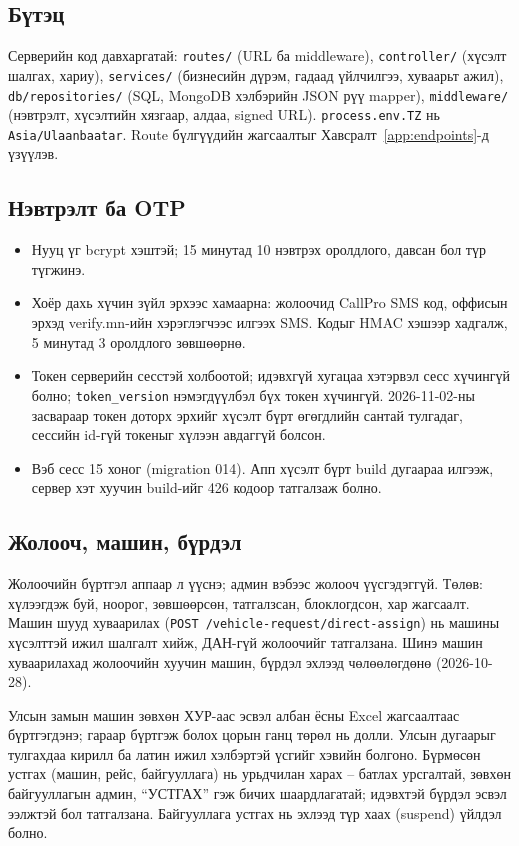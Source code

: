 \documentclass[
12pt,
oneside,
english,
onehalfspacing,
nolistspacing,
headsepline,
]{MUST-Thesis}
\begin{document}
\subsection{Бүтэц}

Серверийн код давхаргатай: \texttt{routes/} (URL ба middleware), \texttt{controller/} (хүсэлт шалгах, хариу), \texttt{services/} (бизнесийн дүрэм, гадаад үйлчилгээ, хуваарьт ажил), \texttt{db/repositories/} (SQL, MongoDB хэлбэрийн JSON рүү mapper), \texttt{middleware/} (нэвтрэлт, хүсэлтийн хязгаар, алдаа, signed URL). \texttt{process.env.TZ} нь \texttt{Asia/Ulaanbaatar}. Route бүлгүүдийн жагсаалтыг Хавсралт~\ref{app:endpoints}-д үзүүлэв.

\subsection{Нэвтрэлт ба OTP}

\begin{itemize}
    \item Нууц үг bcrypt хэштэй; 15 минутад 10 нэвтрэх оролдлого, давсан бол түр түгжинэ.
    \item Хоёр дахь хүчин зүйл эрхээс хамаарна: жолоочид CallPro SMS код, оффисын эрхэд verify.mn-ийн хэрэглэгчээс илгээх SMS. Кодыг HMAC хэшээр хадгалж, 5 минутад 3 оролдлого зөвшөөрнө.
    \item Токен серверийн сесстэй холбоотой; идэвхгүй хугацаа хэтэрвэл сесс хүчингүй болно; \texttt{token\_version} нэмэгдүүлбэл бүх токен хүчингүй. 2026-11-02-ны засвараар токен доторх эрхийг хүсэлт бүрт өгөгдлийн сантай тулгадаг, сессийн id-гүй токеныг хүлээн авдаггүй болсон.
    \item Вэб сесс 15 хоног (migration 014). Апп хүсэлт бүрт build дугаараа илгээж, сервер хэт хуучин build-ийг 426 кодоор татгалзаж болно.
\end{itemize}

\subsection{Жолооч, машин, бүрдэл}

Жолоочийн бүртгэл аппаар л үүснэ; админ вэбээс жолооч үүсгэдэггүй. Төлөв: хүлээгдэж буй, ноорог, зөвшөөрсөн, татгалзсан, блоклогдсон, хар жагсаалт. Машин шууд хуваарилах (\texttt{POST /vehicle-request/direct-assign}) нь машины хүсэлттэй ижил шалгалт хийж, ДАН-гүй жолоочийг татгалзана. Шинэ машин хуваарилахад жолоочийн хуучин машин, бүрдэл эхлээд чөлөөлөгдөнө (2026-10-28).

Улсын замын машин зөвхөн ХУР-аас эсвэл албан ёсны Excel жагсаалтаас бүртгэгдэнэ; гараар бүртгэж болох цорын ганц төрөл нь долли. Улсын дугаарыг тулгахдаа кирилл ба латин ижил хэлбэртэй үсгийг хэвийн болгоно. Бүрмөсөн устгах (машин, рейс, байгууллага) нь урьдчилан харах -- батлах урсгалтай, зөвхөн байгууллагын админ, ``УСТГАХ'' гэж бичих шаардлагатай; идэвхтэй бүрдэл эсвэл ээлжтэй бол татгалзана. Байгууллага устгах нь эхлээд түр хаах (suspend) үйлдэл болно.
\end{document}
